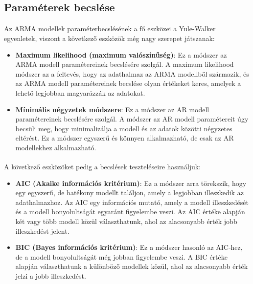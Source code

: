\documentclass[11pt,a4paper]{article}
\begin{document}
				\subsection{Paraméterek becslése}
					\paragraph{}
						Az ARMA modellek paraméterbecslésének a fő eszközei a Yule-Walker egyenletek, viszont a következő eszközök még nagy szerepet játszanak:
						\begin{itemize}
							\item \textbf{Maximum likelihood (maximum valószínűség)}: Ez a módszer az ARMA modell paramétereinek becslésére szolgál. A maximum likelihood módszer az a feltevés, hogy az adathalmaz az ARMA modellből származik, és az ARMA modell paramétereinek becslése olyan értékeket keres, amelyek a lehető legjobban magyarázzák az adatokat.
							
							\item \textbf{Mínimális négyzetek módszere}: Ez a módszer az AR modell paramétereinek becslésére szolgál. A módszer az AR modell paramétereit úgy becsüli meg, hogy minimalizálja a modell és az adatok közötti négyzetes eltérést. Ez a módszer egyszerű és könnyen alkalmazható, de csak az AR modellekhez alkalmazható.
						\end{itemize}
						
					\paragraph{}
						A következő eszközöket pedig a becslések teszteléseire használjuk:
						\begin{itemize}
							\item \textbf{AIC (Akaike információs kritérium)}: Ez a módszer arra törekszik, hogy egy egyszerű, de hatékony modellt találjon, amely a legjobban illeszkedik az adathalmazhoz. Az AIC egy információs mutató, amely a modell illeszkedését és a modell bonyolultságát egyaránt figyelembe veszi. Az AIC értéke alapján két vagy több modell közül választhatunk, ahol az alacsonyabb érték jobb illeszkedést jelent.
							\item \textbf{BIC (Bayes információs kritérium)}: Ez a módszer hasonló az AIC-hez, de a modell bonyolultságát még jobban figyelembe veszi. A BIC értéke alapján választhatunk a különböző modellek közül, ahol az alacsonyabb érték jelzi a jobb illeszkedést.
						\end{itemize}
\end{document}
